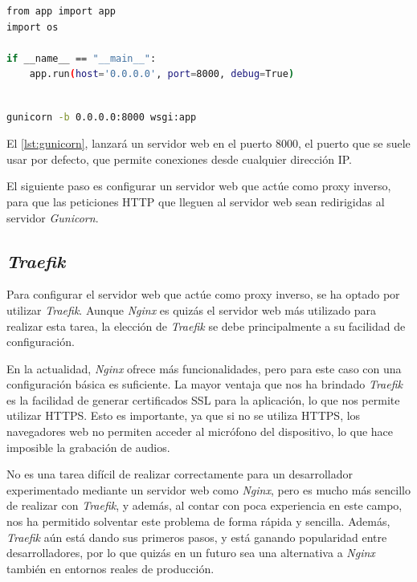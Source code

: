 \begin{lstlisting}[language=bash, caption={Código guardado en 'wsgi.py'.}, label={lst:wsgi}]
from app import app
import os

if __name__ == "__main__":
    app.run(host='0.0.0.0', port=8000, debug=True)
    

\end{lstlisting}

\begin{lstlisting}[language=bash, caption={Comando para lanzar la aplicación con \textit{Gunicorn}.}, label={lst:gunicorn}]
    gunicorn -b 0.0.0.0:8000 wsgi:app
\end{lstlisting}

El \autoref{lst:gunicorn}, lanzará un servidor web en el puerto 8000, el puerto que se suele usar por defecto, que permite conexiones desde cualquier dirección IP.

El siguiente paso es configurar un servidor web que actúe como proxy inverso, para que las peticiones HTTP que lleguen al servidor web sean redirigidas al servidor \textit{Gunicorn}.


\subsection{\textit{Traefik}}
Para configurar el servidor web que actúe como proxy inverso, se ha optado por utilizar \textit{Traefik}.
Aunque \textit{Nginx} es quizás el servidor web más utilizado para realizar esta tarea, la elección de \textit{Traefik} se debe principalmente a su facilidad de configuración.

En la actualidad, \textit{Nginx} ofrece más funcionalidades, pero para este caso con una configuración básica es suficiente.
La mayor ventaja que nos ha brindado \textit{Traefik} es la facilidad de generar certificados SSL para la aplicación, lo que nos permite utilizar HTTPS.
Esto es importante, ya que si no se utiliza HTTPS, los navegadores web no permiten acceder al micrófono del dispositivo, lo que hace imposible la grabación de audios.

No es una tarea difícil de realizar correctamente para un desarrollador experimentado mediante un servidor web como \textit{Nginx}, pero es mucho más sencillo de realizar con \textit{Traefik}, y además, al contar con poca experiencia en este campo, nos ha permitido solventar este problema de forma rápida y sencilla.
Además, \textit{Traefik} aún está dando sus primeros pasos, y está ganando popularidad entre desarrolladores, por lo que quizás en un futuro sea una alternativa a \textit{Nginx} también en entornos reales de producción.

